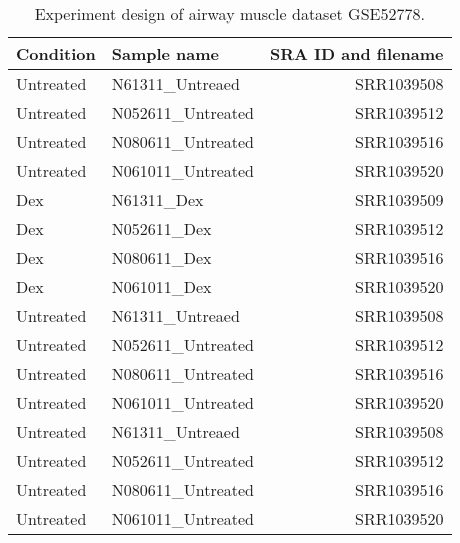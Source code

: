 \begin{table}[!htbp]
    \caption[Experiment design of GSE52778]{
        Experiment design of airway muscle dataset GSE52778.
    }
    \label{tab:gse52778}
    \centering
    \begin{threeparttable}
        \begin{tabular}{llr}
            \toprule
            Condition & Sample name & SRA ID and filename \\
            \midrule
            Untreated & N61311_Untreaed   & SRR1039508 \\
            Untreated & N052611_Untreated & SRR1039512 \\
            Untreated & N080611_Untreated & SRR1039516 \\
            Untreated & N061011_Untreated & SRR1039520 \\

            Dex & N61311_Dex   & SRR1039509 \\
            Dex & N052611_Dex & SRR1039512 \\
            Dex & N080611_Dex & SRR1039516 \\
            Dex & N061011_Dex & SRR1039520 \\

            Untreated & N61311_Untreaed   & SRR1039508 \\
            Untreated & N052611_Untreated & SRR1039512 \\
            Untreated & N080611_Untreated & SRR1039516 \\
            Untreated & N061011_Untreated & SRR1039520 \\

            Untreated & N61311_Untreaed   & SRR1039508 \\
            Untreated & N052611_Untreated & SRR1039512 \\
            Untreated & N080611_Untreated & SRR1039516 \\
            Untreated & N061011_Untreated & SRR1039520 \\
            \bottomrule
        \end{tabular}
    \end{threeparttable}
\end{table}
